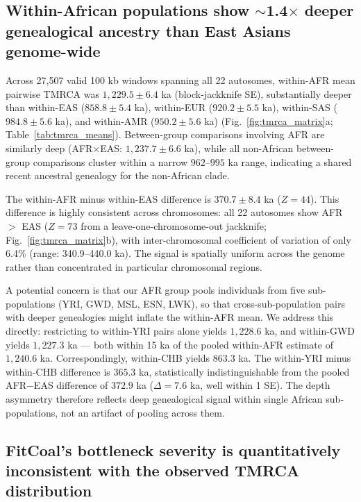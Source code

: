 \subsection*{Within-African populations show $\sim$1.4$\times$ deeper genealogical ancestry than East Asians genome-wide}

Across 27,507 valid 100 kb windows spanning all 22 autosomes, within-AFR mean pairwise TMRCA was $1{,}229.5 \pm 6.4$ ka (block-jackknife SE), substantially deeper than within-EAS ($858.8 \pm 5.4$ ka), within-EUR ($920.2 \pm 5.5$ ka), within-SAS ($984.8 \pm 5.6$ ka), and within-AMR ($950.2 \pm 5.6$ ka) (Fig.~\ref{fig:tmrca_matrix}a; Table~\ref{tab:tmrca_means}). Between-group comparisons involving AFR are similarly deep (AFR$\times$EAS: $1{,}237.7 \pm 6.6$ ka), while all non-African between-group comparisons cluster within a narrow $962$--$995$ ka range, indicating a shared recent ancestral genealogy for the non-African clade.

The within-AFR minus within-EAS difference is $370.7 \pm 8.4$ ka ($Z = 44$). This difference is highly consistent across chromosomes: all 22 autosomes show AFR $>$ EAS ($Z = 73$ from a leave-one-chromosome-out jackknife; Fig.~\ref{fig:tmrca_matrix}b), with inter-chromosomal coefficient of variation of only 6.4\% (range: 340.9--440.0 ka). The signal is spatially uniform across the genome rather than concentrated in particular chromosomal regions.

A potential concern is that our AFR group pools individuals from five sub-populations (YRI, GWD, MSL, ESN, LWK), so that cross-sub-population pairs with deeper genealogies might inflate the within-AFR mean. We address this directly: restricting to within-YRI pairs alone yields $1{,}228.6$ ka, and within-GWD yields $1{,}227.3$ ka --- both within 15 ka of the pooled within-AFR estimate of $1{,}240.6$ ka. Correspondingly, within-CHB yields $863.3$ ka. The within-YRI minus within-CHB difference is $365.3$ ka, statistically indistinguishable from the pooled AFR$-$EAS difference of $372.9$ ka ($\Delta = 7.6$ ka, well within 1 SE). The depth asymmetry therefore reflects deep genealogical signal within single African sub-populations, not an artifact of pooling across them.

\subsection*{FitCoal's bottleneck severity is quantitatively inconsistent with the observed TMRCA distribution}

